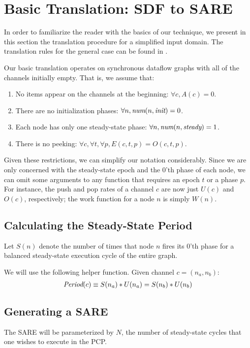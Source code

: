 \section{Basic Translation: SDF to SARE}
\label{sec:simple}

In order to familiarize the reader with the basics of our technique,
we present in this section the translation procedure for a simplified
input domain.  The translation rules for the general case can be found
in .

Our basic translation operates on synchronous dataflow graphs with all
of the channels initially empty.  That is, we assume that:
\begin{enumerate}

\item No items appear on the channels at the beginning:  $\forall c, A(c) = 0$.

\item There are no initialization phases: $\forall n, \mbox{\it num}(n, \mbox{\it init}) = 0$.

\item Each node has only one steady-state phase: $\forall n, \mbox{\it num}(n, \mbox{\it steady}) = 1$.

\item There is no peeking: $\forall c, \forall t, \forall p, E(c, t, p) = O(c, t, p)$.

\end{enumerate}

Given these restrictions, we can simplify our notation considerably.
Since we are only concerned with the steady-state epoch and the 0'th
phase of each node, we can omit some arguments to any function that
requires an epoch $t$ or a phase $p$.  For instance, the push and pop
rates of a channel $c$ are now just $U(c)$ and $O(c)$, respectively;
the work function for a node $n$ is simply $W(n)$.

\subsection{Calculating the Steady-State Period}

Let $S(n)$ denote the number of times that node $n$ fires its 0'th
phase for a balanced steady-state execution cycle of the entire
graph. 

We will use the following helper function.  Given channel $c = (n_a, n_b)$:
\begin{align*}
\mbox{\it Period}(c) \equiv S(n_a) * U(n_a) = S(n_b) * U(n_b)
\end{align*}

\subsection{Generating a SARE}

The SARE will be parameterized by $N$, the number of steady-state
cycles that one wishes to execute in the PCP.



